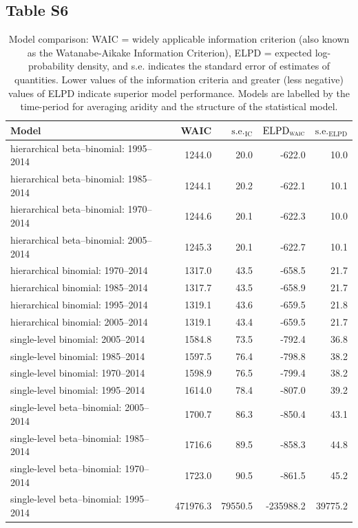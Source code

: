 \documentclass[draft]{agujournal}\usepackage{knitr}
\begin{document}
\subsection*{Table S6}
\begin{table}[H]
\centering
\begingroup\small
\begin{tabular}{p{3in}rrrr}
  \hline
Model & WAIC & $\text{s.e.}_{\text{IC}}$ & $\text{ELPD}_{\text{\scshape{waic}}}$ & $\text{s.e.}_{\text{ELPD}}$ \\ 
  \hline
hierarchical beta--binomial: 1995--2014 & 1244.0 & 20.0 & -622.0 & 10.0 \\ 
  hierarchical beta--binomial: 1985--2014 & 1244.1 & 20.2 & -622.1 & 10.1 \\ 
  hierarchical beta--binomial: 1970--2014 & 1244.6 & 20.1 & -622.3 & 10.0 \\ 
  hierarchical beta--binomial: 2005--2014 & 1245.3 & 20.1 & -622.7 & 10.1 \\ 
  hierarchical binomial: 1970--2014 & 1317.0 & 43.5 & -658.5 & 21.7 \\ 
  hierarchical binomial: 1985--2014 & 1317.7 & 43.5 & -658.9 & 21.7 \\ 
  hierarchical binomial: 1995--2014 & 1319.1 & 43.6 & -659.5 & 21.8 \\ 
  hierarchical binomial: 2005--2014 & 1319.1 & 43.4 & -659.5 & 21.7 \\ 
  single-level binomial: 2005--2014 & 1584.8 & 73.5 & -792.4 & 36.8 \\ 
  single-level binomial: 1985--2014 & 1597.5 & 76.4 & -798.8 & 38.2 \\ 
  single-level binomial: 1970--2014 & 1598.9 & 76.5 & -799.4 & 38.2 \\ 
  single-level binomial: 1995--2014 & 1614.0 & 78.4 & -807.0 & 39.2 \\ 
  single-level beta--binomial: 2005--2014 & 1700.7 & 86.3 & -850.4 & 43.1 \\ 
  single-level beta--binomial: 1985--2014 & 1716.6 & 89.5 & -858.3 & 44.8 \\ 
  single-level beta--binomial: 1970--2014 & 1723.0 & 90.5 & -861.5 & 45.2 \\ 
  single-level beta--binomial: 1995--2014 & 471976.3 & 79550.5 & -235988.2 & 39775.2 \\ 
   \hline
\end{tabular}
\endgroup
\caption[Model comparison: WAIC (climatological interval).]{Model comparison: WAIC = widely applicable information criterion (also known as the Watanabe-Aikake Information Criterion), ELPD = expected log-probability density, and s.e. indicates the standard error of estimates of quantities. Lower values of the information criteria and greater (less negative) values of ELPD indicate superior model performance. Models are labelled by the time-period for averaging aridity and the structure of the statistical model.} 
\label{tab:waic.years}
\end{table}
\end{document}
